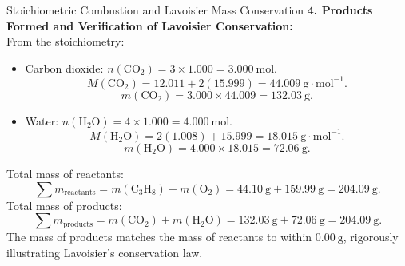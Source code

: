 \begin{workedexample}{Stoichiometric Combustion and Lavoisier Mass Conservation}
\textbf{4. Products Formed and Verification of Lavoisier Conservation:}\\
From the stoichiometry:
\begin{itemize}[leftmargin=1.5em,itemsep=3pt]
  \item Carbon dioxide: $n(\mathrm{CO_2}) = 3 \times 1.000 = 3.000\ \mathrm{mol}$.
  \[
  M(\mathrm{CO_2}) = 12.011 + 2(15.999) = 44.009\ \mathrm{g\cdot mol^{-1}}.
  \]
  \[
  m(\mathrm{CO_2}) = 3.000 \times 44.009 = 132.03\ \mathrm{g}.
  \]
  \item Water: $n(\mathrm{H_2O}) = 4 \times 1.000 = 4.000\ \mathrm{mol}$.
  \[
  M(\mathrm{H_2O}) = 2(1.008) + 15.999 = 18.015\ \mathrm{g\cdot mol^{-1}}.
  \]
  \[
  m(\mathrm{H_2O}) = 4.000 \times 18.015 = 72.06\ \mathrm{g}.
  \]
\end{itemize}
Total mass of reactants:
\[
\sum m_{\text{reactants}} = m(\mathrm{C_3H_8}) + m(\mathrm{O_2}) = 44.10\ \mathrm{g} + 159.99\ \mathrm{g} = 204.09\ \mathrm{g}.
\]
Total mass of products:
\[
\sum m_{\text{products}} = m(\mathrm{CO_2}) + m(\mathrm{H_2O}) = 132.03\ \mathrm{g} + 72.06\ \mathrm{g} = 204.09\ \mathrm{g}.
\]
The mass of products matches the mass of reactants to within $0.00\ \mathrm{g}$, rigorously illustrating Lavoisier's conservation law.
\end{workedexample}

